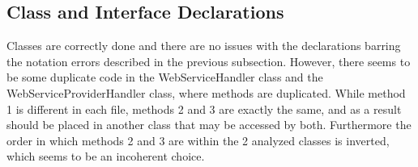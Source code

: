 \subsection{Class and Interface Declarations}

Classes are correctly done and there are no issues with the declarations barring the notation errors described in the previous subsection. However, there seems to be some duplicate code
in the WebServiceHandler class and the WebServiceProviderHandler class, where methods are duplicated. While method 1 is different in each file, methods 2 and 3 are exactly the same, and
as a result should be placed in another class that may be accessed by both.
Furthermore the order in which methods 2 and 3 are within the 2 analyzed classes is inverted, which seems to be an incoherent choice.